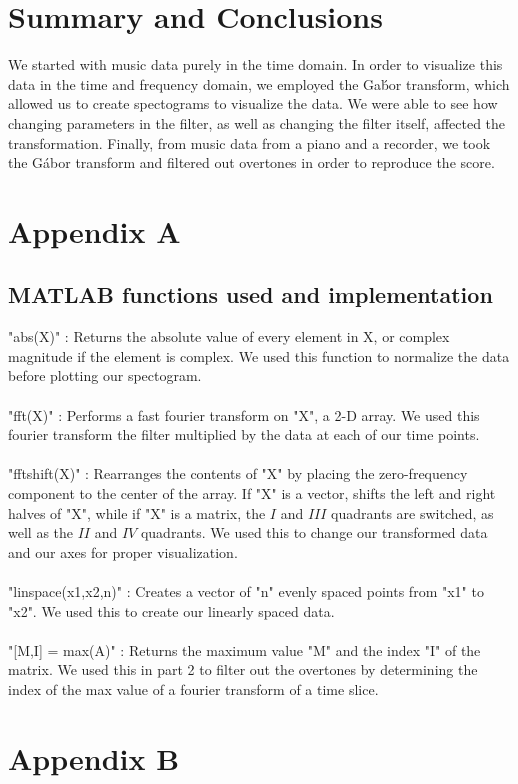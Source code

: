 \documentclass{article}
\begin{document}
\section*{\fontsize{19}{15}\selectfont Summary and Conclusions}
We started with music data purely in the time domain. In order to visualize this data in the time and frequency domain, we employed the Ga\'bor transform, which allowed us to create spectograms to visualize the data. We were able to see how changing parameters in the filter, as well as changing the filter itself, affected the transformation. Finally, from music data from a piano and a recorder, we took the G\'abor transform and filtered out overtones in order to reproduce the score.
\section*{\fontsize{19}{15}\selectfont Appendix A}
\subsection*{MATLAB functions used and implementation}
"abs(X)" : Returns the absolute value of every element in X, or complex magnitude if the element is complex. We used this function to normalize the data before plotting our spectogram.\\ \\
"fft(X)" : Performs a fast fourier transform on "X", a 2-D array. We used this fourier transform the filter multiplied by the data at each of our time points.\\ \\
"fftshift(X)" : Rearranges the contents of "X" by placing the zero-frequency component to the center of the array. If "X" is a vector, shifts the left and right halves of "X", while if "X" is a matrix, the $I$ and $III$ quadrants are switched, as well as the $II$ and $IV$ quadrants. We used this to change our transformed data and our axes for proper visualization.  \\ \\
"linspace(x1,x2,n)" : Creates a vector of "n" evenly spaced points from "x1" to "x2". We used this to create our linearly spaced data.  \\ \\
"[M,I] = max(A)" : Returns the maximum value "M" and the index "I"  of the matrix. We used this in part 2 to filter out the overtones by determining the index of the max value of a fourier transform of a time slice.
\pagebreak
\section*{\fontsize{19}{15}\selectfont Appendix B}
\end{document}
